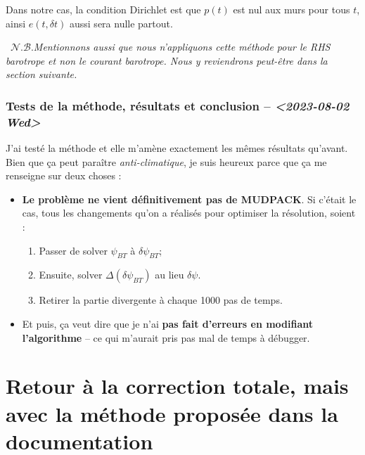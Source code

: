 \documentclass[10pt]{article}
\numberwithin{equation}{section}
\newcommand{\nb}{\raisebox{0.8pt}{\scriptsize\textleaf}\ $\mathscr{N. B.}$\hspace{4pt}}
\begin{document}
Dans notre cas, la condition Dirichlet est que \(p(t)\) est nul aux murs pour tous \(t\), ainsi \(e(t,\delta t)\) aussi sera nulle partout.\bigskip

\nb \emph{Mentionnons aussi que nous n'appliquons cette méthode pour le RHS barotrope et non le courant barotrope. Nous y reviendrons peut-être dans la section suivante.}

\subsubsection{Tests de la méthode, résultats et conclusion -- \textit{<2023-08-02 Wed>}}
\label{sec:org0d14fb9}
J'ai testé la méthode et elle m'amène exactement les mêmes résultats qu'avant.
Bien que ça peut paraître \emph{anti-climatique}, je suis heureux parce que ça me renseigne sur deux choses :
\begin{itemize}
\item \textbf{Le problème ne vient définitivement pas de MUDPACK}.
Si c'était le cas, tous les changements qu'on a réalisés pour optimiser la résolution, soient :
\begin{enumerate}
\item Passer de solver \(\psi_{BT}\) à \(\delta \psi_{BT}\);
\item Ensuite, solver \(\Delta (\delta \psi_{BT})\) au lieu \(\delta\psi\).
\item Retirer la partie divergente à chaque 1000 pas de temps.
\end{enumerate}

\item Et puis, ça veut dire que je n'ai \textbf{pas fait d'erreurs en modifiant l'algorithme} -- ce qui m'aurait pris pas mal de temps à débugger.
\end{itemize}


\section{Retour à la correction totale, mais avec la méthode proposée dans la documentation}
\label{sec:org018f104}
\end{document}
